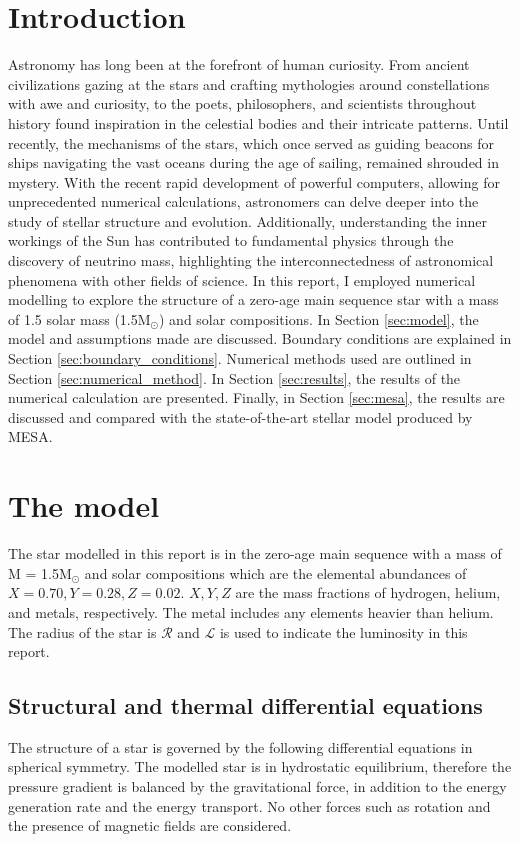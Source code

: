 \documentclass[twocolumn]{aastex631}
\begin{document}


\section{Introduction}
\label{sec:intro}
Astronomy has long been at the forefront of human curiosity. From ancient civilizations gazing at the stars and crafting mythologies around constellations with awe and curiosity, to the poets, philosophers, and scientists throughout history found inspiration in the celestial bodies and their intricate patterns.
Until recently, the mechanisms of the stars, which once served as guiding beacons for ships navigating the vast oceans during the age of sailing, remained shrouded in mystery.
With the recent rapid development of powerful computers, allowing for unprecedented numerical calculations, astronomers can delve deeper into the study of stellar structure and evolution.
Additionally, understanding the inner workings of the Sun has contributed to fundamental physics through the discovery of neutrino mass, highlighting the interconnectedness of astronomical phenomena with other fields of science. In this report, I employed numerical modelling to explore the structure of a zero-age main sequence star with a mass of 1.5 solar mass (1.5M$_\odot$) and solar compositions. In Section \ref{sec:model}, the model and assumptions made are discussed. Boundary conditions are explained in Section \ref{sec:boundary_conditions}. Numerical methods used are outlined in Section \ref{sec:numerical_method}. In Section \ref{sec:results}, the results of the numerical calculation are presented. Finally, in Section \ref{sec:mesa}, the results are discussed and compared with the state-of-the-art stellar model produced by MESA.

\section{The model}
The star modelled in this report is in the zero-age main sequence with a mass of M = 1.5M$_\odot$ and solar compositions which are the elemental abundances of $X = 0.70, Y = 0.28, Z = 0.02$. $X, Y, Z$ are the mass fractions of hydrogen, helium, and metals, respectively. The metal includes any elements heavier than helium. The radius of the star is $\mathcal{R}$ and $\mathcal{L}$ is used to indicate the luminosity in this report.

\label{sec:model}
\subsection{Structural and thermal differential equations}
\label{subsec:structural_and_thermal_differential_equations}
The structure of a star is governed by the following differential equations in spherical symmetry. The modelled star is in hydrostatic equilibrium, therefore the pressure gradient is balanced by the gravitational force, in addition to the energy generation rate and the energy transport. No other forces such as rotation and the presence of magnetic fields are considered.
\end{document}
